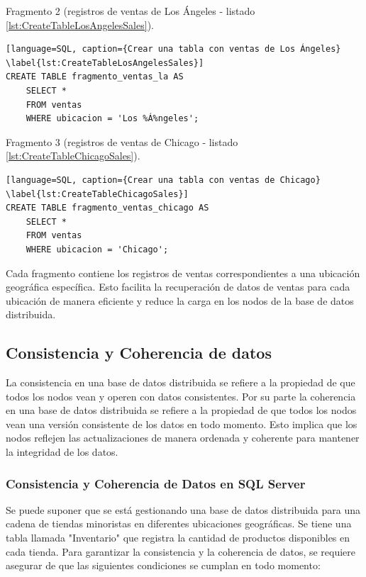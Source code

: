 \noindent
Fragmento 2 (registros de ventas de Los Ángeles - listado \ref{lst:CreateTableLosAngelesSales}).

\begin{lstlisting}[language=SQL, caption={Crear una tabla con ventas de Los Ángeles} \label{lst:CreateTableLosAngelesSales}]
CREATE TABLE fragmento_ventas_la AS
	SELECT *
	FROM ventas
	WHERE ubicacion = 'Los %Á%ngeles';
\end{lstlisting}

Fragmento 3 (registros de ventas de Chicago - listado \ref{lst:CreateTableChicagoSales}).

\begin{lstlisting}[language=SQL, caption={Crear una tabla con ventas de Chicago} \label{lst:CreateTableChicagoSales}]
CREATE TABLE fragmento_ventas_chicago AS
	SELECT *
	FROM ventas
	WHERE ubicacion = 'Chicago';
\end{lstlisting}

Cada fragmento contiene los registros de ventas correspondientes a una ubicación geográfica específica. Esto facilita la recuperación de datos de ventas para cada ubicación de manera eficiente y reduce la carga en los nodos de la base de datos distribuida.

\subsection{Consistencia y Coherencia de datos}
\noindent
La consistencia en una base de datos distribuida se refiere a la propiedad de que todos los nodos vean y operen con datos consistentes. Por su parte la coherencia en una base de datos distribuida se refiere a la propiedad de que todos los nodos vean una versión consistente de los datos en todo momento. Esto implica que los nodos reflejen las actualizaciones de manera ordenada y coherente para mantener la integridad de los datos.

\subsubsection{Consistencia y Coherencia de Datos en SQL Server}
\noindent
Se puede suponer que se está gestionando una base de datos distribuida para una cadena de tiendas minoristas en diferentes ubicaciones geográficas. Se tiene una tabla llamada "Inventario" que registra la cantidad de productos disponibles en cada tienda. Para garantizar la consistencia y la coherencia de datos, se requiere asegurar de que las siguientes condiciones se cumplan en todo momento:

